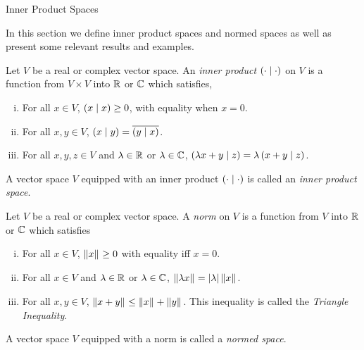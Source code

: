 \begin{section}{Inner Product Spaces}

	In this section we define inner product spaces
	and normed spaces as well as 
	present some relevant results and examples.
	

\begin{defn}\label{defn:InnerProdSp}
	Let $V$ be a real or complex vector space. An \emph{inner product}
	$\innrprod{\cdot}{\cdot}$ on $V$ is a function from $V \times V$
	into $\real$ or $\cmplx$ which satisfies,
		\begin{enumerate}[i)]
			\item
				For all $x \in V$, $\innrprod{x}{x} \geq 0$,
				with equality when $x = 0$.
			\item
				For all $x,y \in V$, $\innrprod{x}{y} =
				\conj{\innrprod{y}{x}}$.
			\item
				For all $x,y,z \in V$ and $\isreal[\lambda]$ or
				$\iscmplx[\lambda]$,
				$\innrprod{\lambda x + y}{z} = \lambda
				\innrprod{x+y}{z}$.
		\end{enumerate}
	A vector space $V$ equipped with an inner product 
	$\innrprod{\cdot}{\cdot}$ is called an \emph{inner product space}.
\end{defn}
	

\begin{defn}\label{defn:NormSp}
	Let $V$ be a real or complex vector space. A \emph{norm} on $V$
	is a function from $V$ into $\real$ or $\cmplx$ which satisfies
		\begin{enumerate}[i)]
			\item
				For all $x \in V$, $\norm[]{x} \geq 0$ with
				equality iff $x=0$.
			\item
				For all $x \in V$ and $\isreal[\lambda]$ or
				$\iscmplx[\lambda]$, $\norm[]
				{\lambda x} = \modulus{\lambda}\norm[]{x}$.
			\item
				For all $x,y \in V$, $\norm[]{x+y} \leq \norm[]{x} +
				\norm[]{y}$. This inequality is called the \emph{
				Triangle Inequality}.
		\end{enumerate}
	A vector space $V$ equipped with a norm is called a \emph{normed
	space}.
\end{defn}


\end{section}
